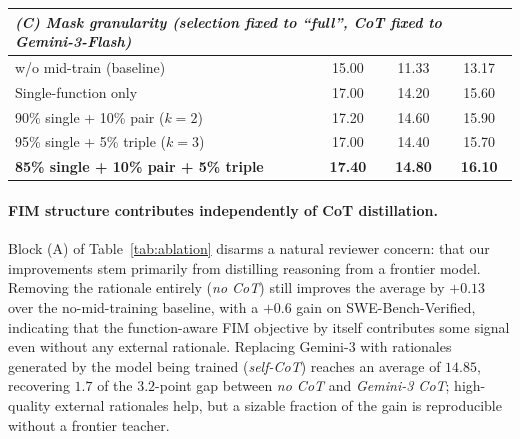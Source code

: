 \begin{table}[t]
\begin{tabular}{lccc}
\midrule
\multicolumn{4}{l}{\emph{(C) Mask granularity (selection fixed to ``full'', CoT fixed to Gemini-3-Flash)}} \\
\midrule
w/o mid-train (baseline)             & 15.00 & 11.33 & 13.17 \\
Single-function only                 & 17.00 & 14.20 & 15.60 \\
90\% single + 10\% pair ($k=2$)       & 17.20 & 14.60 & 15.90 \\
95\% single + 5\% triple ($k=3$)      & 17.00 & 14.40 & 15.70 \\
\textbf{85\% single + 10\% pair + 5\% triple} & \textbf{17.40} & \textbf{14.80} & \textbf{16.10} \\
\bottomrule
\end{tabular}
\end{table}

\paragraph{FIM structure contributes independently of CoT distillation.}
Block (A) of Table~\ref{tab:ablation} disarms a natural reviewer concern:
that our improvements stem primarily from distilling reasoning from a
frontier model. Removing the rationale entirely (\emph{no CoT}) still
improves the average by $+0.13$ over the no-mid-training baseline, with a
$+0.6$ gain on SWE-Bench-Verified, indicating that the function-aware FIM
objective by itself contributes some signal even without any external
rationale. Replacing Gemini-3 with rationales generated by the model
being trained (\emph{self-CoT}) reaches an average of $14.85$, recovering
$1.7$ of the $3.2$-point gap between \emph{no CoT} and \emph{Gemini-3 CoT};
high-quality external rationales help, but a sizable fraction of the
gain is reproducible without a frontier teacher.

